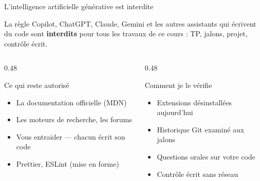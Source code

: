\documentclass[aspectratio=169,11pt]{beamer}
\begin{document}
\begin{frame}{L'intelligence artificielle générative est interdite}
  \begin{alertblock}{La règle}
    Copilot, ChatGPT, Claude, Gemini et les autres assistants qui écrivent du code sont \textbf{interdits} pour tous les travaux de ce cours : TP, jalons, projet, contrôle écrit.
  \end{alertblock}
  \vspace{0.4cm}
  \begin{columns}[T]
    \begin{column}{0.48\textwidth}
      \begin{block}{Ce qui reste autorisé}
        \begin{itemize}
          \item La documentation officielle (MDN)
          \item Les moteurs de recherche, les forums
          \item Vous entraider --- chacun écrit son code
          \item Prettier, ESLint (mise en forme)
        \end{itemize}
      \end{block}
    \end{column}
    \begin{column}{0.48\textwidth}
      \begin{block}{Comment je le vérifie}
        \begin{itemize}
          \item Extensions désinstallées aujourd'hui
          \item Historique Git examiné aux jalons
          \item Questions orales sur votre code
          \item Contrôle écrit sans réseau
        \end{itemize}
      \end{block}
    \end{column}
  \end{columns}
\end{frame}
\end{document}
